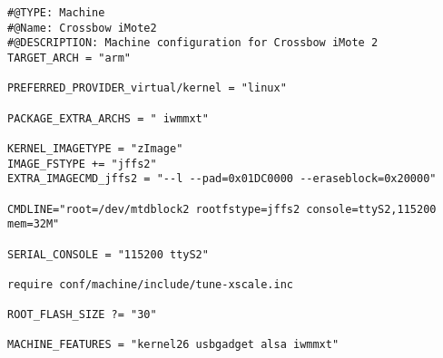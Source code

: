 \label{annexoe}

\begin{verbatim}
#@TYPE: Machine
#@Name: Crossbow iMote2
#@DESCRIPTION: Machine configuration for Crossbow iMote 2
TARGET_ARCH = "arm"

PREFERRED_PROVIDER_virtual/kernel = "linux"

PACKAGE_EXTRA_ARCHS = " iwmmxt"

KERNEL_IMAGETYPE = "zImage"
IMAGE_FSTYPE += "jffs2"
EXTRA_IMAGECMD_jffs2 = "--l --pad=0x01DC0000 --eraseblock=0x20000"

CMDLINE="root=/dev/mtdblock2 rootfstype=jffs2 console=ttyS2,115200 mem=32M"

SERIAL_CONSOLE = "115200 ttyS2"

require conf/machine/include/tune-xscale.inc

ROOT_FLASH_SIZE ?= "30"

MACHINE_FEATURES = "kernel26 usbgadget alsa iwmmxt"
\end{verbatim}
